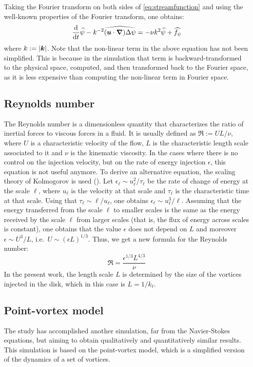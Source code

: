\documentclass[../main.tex]{subfiles}
\begin{document}
Taking the Fourier transform on both sides of \cref{eq:streamfunction} and using the well-known properties of the Fourier transform, one obtains:
\begin{equation}\label{eq:streamfunction_fourier}
	\dv{}{t}\widehat{\psi} - k^{-2} \widehat{(\boldsymbol{u}\cdot \grad) \Delta \psi}= -\nu k^2 \widehat{\psi} + \widehat{f_\psi}
\end{equation}
where $k:=\abs{\boldsymbol{k}}$. Note that the non-linear term in the above equation has not been simplified. This is because in the simulation that term is backward-transformed to the physical space, computed, and then transformed back to the Fourier space, as it is less expensive than computing the non-linear term in Fourier space.

\subsection{Reynolds number}
The Reynolds number is a dimensionless quantity that characterizes the ratio of inertial forces to viscous forces in a fluid. It is usually defined as $\Re:= U L/\nu$, where $U$ is a characteristic velocity of the flow, $L$ is the characteristic length scale associated to it and $\nu$ is the kinematic viscosity. In the cases where there is no control on the injection velocity, but on the rate of energy injection $\epsilon$, this equation is not useful anymore. To derive an alternative equation, the scaling theory of Kolmogorov is used (\cite{Frisch}). Let $\epsilon_\ell \sim u_\ell^2 / \tau_\ell$ be the rate of change of energy at the scale $\ell$, where $u_\ell$ is the velocity at that scale and $\tau_\ell$ is the characteristic time at that scale. Using that $\tau_\ell\sim \ell/u_\ell$, one obtains $\epsilon_\ell \sim u_\ell^3/\ell$. Assuming that the energy transferred from the scale $\ell$ to smaller scales is the same as the energy received by the scale $\ell$ from larger scales (that is, the flux of energy across scales is constant), one obtains that the value $\epsilon$ does not depend on $L$ and moreover $\epsilon \sim U^3/L$, i.e.\ $U \sim {(\epsilon L)}^{1/3}$. Thus, we get a new formula for the Reynolds number:
\begin{equation}
	\Re=\frac{\epsilon^{1/3} L^{4/3}}{\nu}
\end{equation}
In the present work, the length scale $L$ is determined by the size of the vortices injected in the disk, which in this case is $L=1/k_\ell$.

\subsection{Point-vortex model}
The study has accomplished another simulation, far from the Navier-Stokes equations, but aiming to obtain qualitatively and quantitatively similar results. This simulation is based on the point-vortex model, which is a simplified version of the dynamics of a set of vortices.
\end{document}
